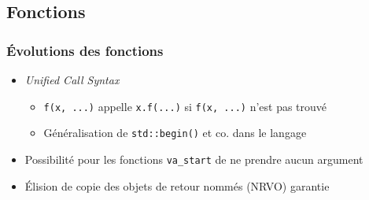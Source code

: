 \documentclass[C++.tex]{subfiles}
\begin{document}
\subsection*{Fonctions}
\begin{frame}[fragile]
	\frametitle{Évolutions des fonctions}
	\begin{itemize}
		\item \textit{Unified Call Syntax}
		\begin{itemize}
			\item \lstinline|f(x, ...)| appelle \lstinline|x.f(...)| si \lstinline|f(x, ...)| n'est pas trouvé
			\item Généralisation de \lstinline|std::begin()| et co. dans le langage
		\end{itemize}
		\item Possibilité pour les fonctions \lstinline|va_start| de ne prendre aucun argument
		\item Élision de copie des objets de retour nommés (NRVO) garantie

	\end{itemize}
\end{frame}
\end{document}
